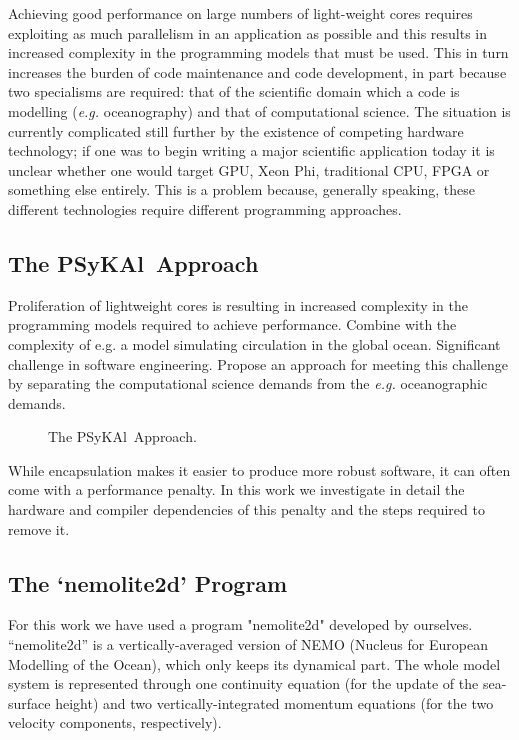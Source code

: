 \documentclass[journal]{IEEEtran}
\newcommand{\psykal}{{PS}y{KA}l\ }
\begin{document}
Achieving good performance on large numbers of light-weight cores
requires exploiting as much parallelism in an application as possible
and this results in increased complexity in the programming models
that must be used. This in turn increases the burden of code
maintenance and code development, in part because two specialisms are
required: that of the scientific domain which a code is modelling
({\it e.g.} oceanography) and that of computational science. The
situation is currently complicated still further by the existence of
competing hardware technology; if one was to begin writing a major
scientific application today it is unclear whether one would target
GPU, Xeon Phi, traditional CPU, FPGA or something else entirely. This
is a problem because, generally speaking, these different technologies
require different programming approaches.


\subsection{The \psykal Approach}
Proliferation of lightweight cores is resulting in increased
complexity in the programming models required to achieve performance.
Combine with the complexity of e.g. a model simulating circulation in
the global ocean. Significant challenge in software engineering.
Propose an approach for meeting this challenge by separating the
computational science demands from the {\it e.g.} oceanographic
demands.

\begin{figure}
\centering
\caption{The \psykal Approach.}
\end{figure}

While encapsulation makes it easier to produce more robust software,
it can often come with a performance penalty. In this work we
investigate in detail the hardware and compiler dependencies of this
penalty and the steps required to remove it.

\subsection{The `nemolite2d' Program}

For this work we have used a program "nemolite2d" developed by
ourselves.  “nemolite2d” is a vertically-averaged version of NEMO
(Nucleus for European Modelling of the Ocean), which only keeps its
dynamical part. The whole model system is represented through one
continuity equation (for the update of the sea-surface height) and two
vertically-integrated momentum equations (for the two velocity
components, respectively).
\end{document}

